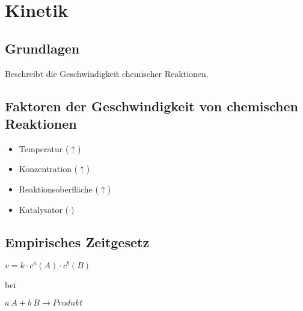 \section{Kinetik}

\subsection{Grundlagen}

Beschreibt die Geschwindigkeit chemischer Reaktionen.

\subsection{Faktoren der Geschwindigkeit von chemischen Reaktionen}

\begin{itemize}
	\item Temperatur ($\uparrow$)
	\item Konzentration ($\uparrow$)
	\item Reaktionsoberfläche ($\uparrow$)
	\item Katalysator ($\cdot$)
\end{itemize}

\subsection{Empirisches Zeitgesetz}

\large{
	$v=k\cdot c^a(A)\cdot c^b(B)$	
}

bei

\large{
	$a \ A + b\  B \rightarrow Produkt$
}